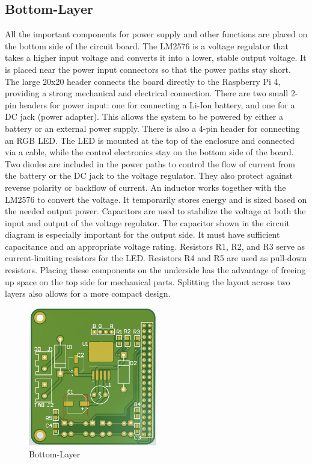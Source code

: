 \subsection{Bottom-Layer}
All the important components for power supply and other functions are placed on the bottom side of the circuit board.
The LM2576 is a voltage regulator that takes a higher input voltage and converts it into a lower, stable output voltage. It is placed near the power input connectors so that the power paths stay short. The large 20x20 header connects the board directly to the Raspberry Pi 4, providing a strong mechanical and electrical connection.
There are two small 2-pin headers for power input: one for connecting a Li-Ion battery, and one for a DC jack (power adapter). This allows the system to be powered by either a battery or an external power supply. There is also a 4-pin header for connecting an RGB LED. The LED is mounted at the top of the enclosure and connected via a cable, while the control electronics stay on the bottom side of the board.
Two diodes are included in the power paths to control the flow of current from the battery or the DC jack to the voltage regulator. They also protect against reverse polarity or backflow of current. An inductor works together with the LM2576 to convert the voltage. It temporarily stores energy and is sized based on the needed output power.
Capacitors are used to stabilize the voltage at both the input and output of the voltage regulator. The capacitor shown in the circuit diagram is especially important for the output side. It must have sufficient capacitance and an appropriate voltage rating. Resistors R1, R2, and R3 serve as current-limiting resistors for the LED. Resistors R4 and R5 are used as pull-down resistors.
Placing these components on the underside has the advantage of freeing up space on the top side for mechanical parts. Splitting the layout across two layers also allows for a more compact design.

\begin{figure}[H]
  \centering
  \includegraphics[width=0.5\textwidth]{assets/Bottom Layer.png}
  \caption{Bottom-Layer}
\end{figure}

